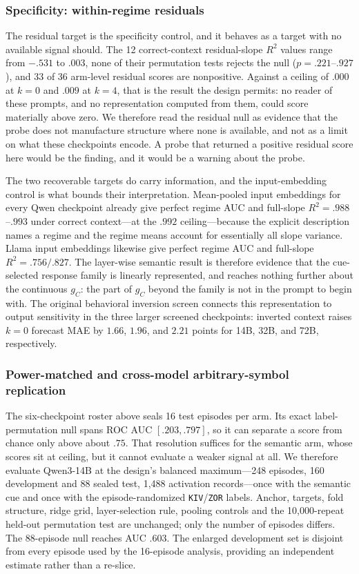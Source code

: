 \subsubsection{Specificity: within-regime residuals}
The residual target is the specificity control, and it behaves as a target with
no available signal should. The 12 correct-context residual-slope $R^2$ values
range from $-.531$ to $.003$, none of their permutation tests rejects the null
($p=.221$--$.927$), and 33 of 36 arm-level residual scores are nonpositive.
Against a ceiling of $.000$ at $k=0$ and $.009$ at $k=4$, that is the result the
design permits: no reader of these prompts, and no representation computed from
them, could score materially above zero. We therefore read the residual null as
evidence that the probe does not manufacture structure where none is available,
and not as a limit on what these checkpoints encode. A probe that returned a
positive residual score here would be the finding, and it would be a warning
about the probe.

The two recoverable targets do carry information, and the input-embedding control
is what bounds their interpretation. Mean-pooled input embeddings for every Qwen
checkpoint already give perfect regime AUC and full-slope $R^2=.988$--$.993$ under
correct context---at the $.992$ ceiling---because the explicit description names a
regime and the regime means account for essentially all slope variance. Llama
input embeddings likewise give perfect regime AUC and full-slope $R^2=.756/.827$.
The layer-wise semantic result is therefore evidence that the cue-selected
response family is linearly represented, and reaches nothing further about the
continuous $g_C$: the part of $g_C$ beyond the family is not in the prompt to
begin with. The original behavioral inversion screen connects this representation
to output sensitivity in the three larger screened checkpoints: inverted context
raises $k=0$ forecast MAE by $1.66$, $1.96$, and $2.21$ points for 14B, 32B, and
72B, respectively.

\subsubsection{Power-matched and cross-model arbitrary-symbol replication}
\label{app:coin-city-probe-power}

The six-checkpoint roster above seals 16 test episodes per arm. Its exact
label-permutation null spans ROC AUC $[.203,.797]$, so it can separate a score
from chance only above about $.75$. That resolution suffices for the semantic arm,
whose scores sit at ceiling, but it cannot evaluate a weaker signal at all. We
therefore evaluate Qwen3-14B at the design's balanced maximum---248
episodes, 160 development and 88 sealed test, 1,488 activation records---once with
the semantic cue and once with the episode-randomized \texttt{KIV}/\texttt{ZOR}
labels. Anchor, targets, fold structure, ridge grid, layer-selection rule, pooling
controls and the 10,000-repeat held-out permutation test are unchanged; only the
number of episodes differs. The 88-episode null reaches AUC $.603$. The enlarged
development set is disjoint from every episode used by the 16-episode analysis,
providing an independent estimate rather than a re-slice.

